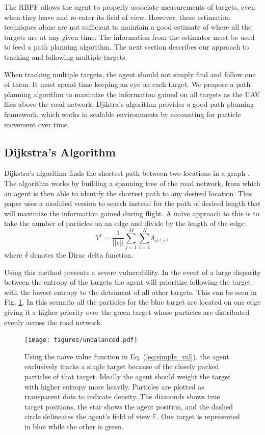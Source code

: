 \documentclass[letterpaper, 10 pt, conference]{ieeeconf}  %
\begin{document}
The RBPF allows the agent to properly associate measurements of targets, even when they leave and re-enter its field of view. However, these estimation techniques alone are not sufficient to maintain a good estimate of where all the targets are at any given time. The information from the estimator must be used to feed a path planning algorithm. The next section describes our approach to tracking and following multiple targets.

When tracking multiple targets, the agent should not simply find and follow one of them. It must spend time keeping an eye on each target. We propose a path planning algorithm to maximize the information gained on all targets as the UAV flies above the road network. Djiktra's algorithm provides a good path planning framework, which works in scalable environments by accounting for particle movement over time.

\subsection{Dijkstra's Algorithm}
Dijkstra's algorithm finds the shortest path between two locations in a graph \cite{skiena1998algorithm}. The algorithm works by building a spanning tree of the road network, from which an agent is then able to identify the shortest path to any desired location. This paper uses a modified version to search instead for the path of desired length that will maximize the information gained during flight. A na\"ive approach to this is to take the number of particles on an edge and divide by the length of the edge:
\begin{equation}\label{eq:simple_val}
V^{e} = \frac{1}{||e||}\sum_{j=1}^M \sum_{i=1}^{N}\delta_{e^{j,i},e},
\end{equation}
where $\delta$ denotes the Dirac delta function.

Using this method presents a severe vulnerability. In the event of a large disparity between the entropy of the targets the agent will prioritize following the target with the lowest entropy to the detriment of all other targets. This can be seen in Fig. \ref{fig:unbalanced}. In this scenario all the particles for the blue target are located on one edge giving it a higher priority over the green target whose particles are distributed evenly across the road network.

\begin{figure}
\centering
\texttt{[image: figures/unbalanced.pdf]}
\caption{Using the na\"ive value function in Eq. (\ref{eq:simple_val}), the agent exclusively tracks a single target because of the closely packed particles of that target. Ideally the agent should weight the target with higher entropy more heavily. Particles are plotted as transparent dots to indicate density. The diamonds shows true target positions, the star shows the agent position, and the dashed circle delineates the agent's field of view $\mathbb{F}$. One target is represented in blue while the other is green.}
\label{fig:unbalanced}
\end{figure}
\end{document}
